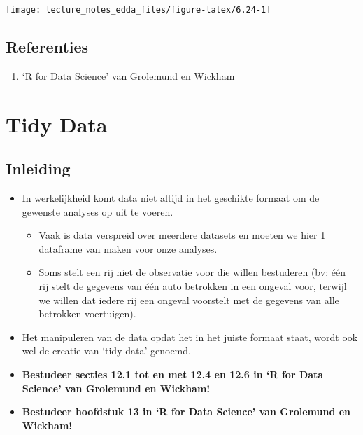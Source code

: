 \documentclass[]{memoir}
\providecommand{\tightlist}{%
  \setlength{\itemsep}{0pt}\setlength{\parskip}{0pt}}
\begin{document}
\texttt{[image: lecture\_notes\_edda\_files/figure-latex/6.24-1]}

\hypertarget{referenties-4}{%
\section{Referenties}\label{referenties-4}}

\begin{enumerate}
\def\labelenumi{\arabic{enumi}.}
\tightlist
\item
  \href{http://r4ds.had.co.nz/}{`R for Data Science' van Grolemund en Wickham}
\end{enumerate}

\hypertarget{tidy-data}{%
\chapter{Tidy Data}\label{tidy-data}}

\hypertarget{inleiding-1}{%
\section{Inleiding}\label{inleiding-1}}

\begin{itemize}
\tightlist
\item
  In werkelijkheid komt data niet altijd in het geschikte formaat om de gewenste analyses op uit te voeren.

  \begin{itemize}
  \tightlist
  \item
    Vaak is data verspreid over meerdere datasets en moeten we hier 1 dataframe van maken voor onze analyses.
  \item
    Soms stelt een rij niet de observatie voor die willen bestuderen (bv: één rij stelt de gegevens van één auto betrokken in een ongeval voor, terwijl we willen dat iedere rij een ongeval voorstelt met de gegevens van alle betrokken voertuigen).
  \end{itemize}
\item
  Het manipuleren van de data opdat het in het juiste formaat staat, wordt ook wel de creatie van `tidy data' genoemd.
\item
  \textbf{Bestudeer secties 12.1 tot en met 12.4 en 12.6 in `R for Data Science' van Grolemund en Wickham!}
\item
  \textbf{Bestudeer hoofdstuk 13 in `R for Data Science' van Grolemund en Wickham!}
\end{itemize}
\end{document}
